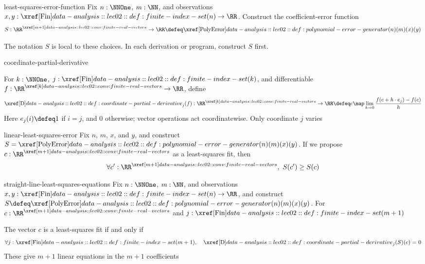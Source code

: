 \documentclass[12pt]{article}
\numberwithin{figure}{section}
\begin{document}
\begin{conv}{least-squares-error-function}
    Fix $n:\NNOne$, $m:\NN$, and observations $x,y:\Fin(n)\to\RR$.
    Construct the coefficient-error function
    \[
      S:\RealVectors{m+1}\to\RR
        \defeq\PolyError(n)(m)(x)(y)
    \]
\end{conv}

\begin{rem}
    The notation $S$ is local to these choices. In each derivation or
    program, construct $S$ first.
\end{rem}


\begin{dfn}{coordinate-partial-derivative}
    \leavevmode\par
    \begingroup\color{notesmissingprereq}
    For $k:\NNOne$, $j:\Fin(k)$, and differentiable
    $f:\RealVectors{k}\to\RR$, define
    \[
      \PartialD_j(f):\RealVectors{k}\to\RR
        \defeq c\map\lim_{h\to0}\frac{f(c+h\cdot e_j)-f(c)}{h}
    \]
    Here $e_j(i)\defeq1$ if $i=j$, and $0$ otherwise; vector operations
    act coordinatewise. Only coordinate $j$ varies
    \par\smallskip{}
    \par\endgroup
\end{dfn}

\begin{dfn}{linear-least-squares-error}
    Fix $n$, $m$, $x$, and $y$, and construct $S = \PolyError(n)(m)(x)(y)$. If we propose $c:\RealVectors{m+1}$ as a least-squares fit, then
    \[\forall c' : \RealVectors{m+1},\ S(c') \geq S(c)\]
\end{dfn}

\begin{thm}{straight-line-least-squares-equations}
    Fix $n:\NNOne$, $m:\NN$, and observations $x,y:\Fin(n)\to\RR$,
    and construct $S\defeq\PolyError(n)(m)(x)(y)$.
    For $c:\RealVectors{m+1}$ and $j:\Fin(m+1)$

    The vector $c$ is a least-squares fit if and only if
    \[
      \forall j:\Fin(m+1),\quad \PartialD_j(S)(c)=0
    \]
    These give $m+1$ linear equations in the $m+1$ coefficients
\end{thm}
\end{document}
